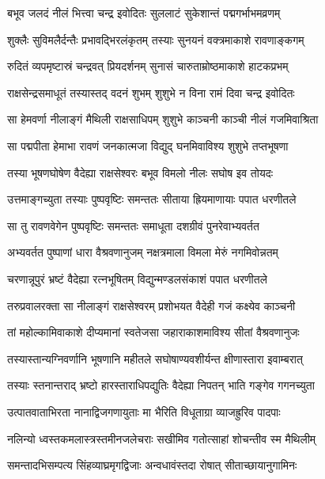 \twolineshloka
{बभूव जलदं नीलं भित्त्वा चन्द्र इवोदितः}
{सुललाटं सुकेशान्तं पद्मगर्भाभमव्रणम्} %

\twolineshloka
{शुक्लैः सुविमलैर्दन्तैः प्रभावद्भिरलंकृतम्}
{तस्याः सुनयनं वक्त्रमाकाशे रावणाङ्कगम्} %

\twolineshloka
{रुदितं व्यपमृष्टास्रं चन्द्रवत् प्रियदर्शनम्}
{सुनासं चारुताम्रोष्ठमाकाशे हाटकप्रभम्} %

\twolineshloka
{राक्षसेन्द्रसमाधूतं तस्यास्तद् वदनं शुभम्}
{शुशुभे न विना रामं दिवा चन्द्र इवोदितः} %

\twolineshloka
{सा हेमवर्णा नीलाङ्गं मैथिली राक्षसाधिपम्}
{शुशुभे काञ्चनी काञ्ची नीलं गजमिवाश्रिता} %

\twolineshloka
{सा पद्मपीता हेमाभा रावणं जनकात्मजा}
{विद्युद् घनमिवाविश्य शुशुभे तप्तभूषणा} %

\twolineshloka
{तस्या भूषणघोषेण वैदेह्या राक्षसेश्वरः}
{बभूव विमलो नीलः सघोष इव तोयदः} %

\twolineshloka
{उत्तमाङ्गच्युता तस्याः पुष्पवृष्टिः समन्ततः}
{सीताया ह्रियमाणायाः पपात धरणीतले} %

\twolineshloka
{सा तु रावणवेगेन पुष्पवृष्टिः समन्ततः}
{समाधूता दशग्रीवं पुनरेवाभ्यवर्तत} %

\twolineshloka
{अभ्यवर्तत पुष्पाणां धारा वैश्रवणानुजम्}
{नक्षत्रमाला विमला मेरुं नगमिवोन्नतम्} %

\twolineshloka
{चरणान्नूपुरं भ्रष्टं वैदेह्या रत्नभूषितम्}
{विद्युन्मण्डलसंकाशं पपात धरणीतले} %

\twolineshloka
{तरुप्रवालरक्ता सा नीलाङ्गं राक्षसेश्वरम्}
{प्रशोभयत वैदेही गजं कक्ष्येव काञ्चनी} %

\twolineshloka
{तां महोल्कामिवाकाशे दीप्यमानां स्वतेजसा}
{जहाराकाशमाविश्य सीतां वैश्रवणानुजः} %

\twolineshloka
{तस्यास्तान्यग्निवर्णानि भूषणानि महीतले}
{सघोषाण्यवशीर्यन्त क्षीणास्तारा इवाम्बरात्} %

\twolineshloka
{तस्याः स्तनान्तराद् भ्रष्टो हारस्ताराधिपद्युतिः}
{वैदेह्या निपतन् भाति गङ्गेव गगनच्युता} %

\twolineshloka
{उत्पातवाताभिरता नानाद्विजगणायुताः}
{मा भैरिति विधूताग्रा व्याजह्रुरिव पादपाः} %

\twolineshloka
{नलिन्यो ध्वस्तकमलास्त्रस्तमीनजलेचराः}
{सखीमिव गतोत्साहां शोचन्तीव स्म मैथिलीम्} %

\twolineshloka
{समन्तादभिसम्पत्य सिंहव्याघ्रमृगद्विजाः}
{अन्वधावंस्तदा रोषात् सीताच्छायानुगामिनः} %

